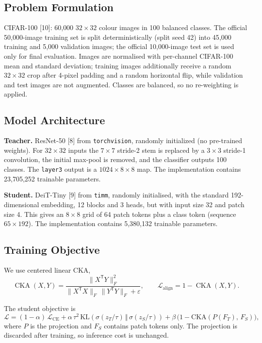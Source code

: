 \documentclass[11pt, letterpaper]{article}
\begin{document}
\subsection{Problem Formulation}

CIFAR-100 [10]: 60{,}000 $32\times32$ colour images in 100 balanced classes.
The official 50{,}000-image training set is split deterministically (split seed
42) into 45{,}000 training and 5{,}000 validation images; the official
10{,}000-image test set is used only for final evaluation. Images are
normalised with per-channel CIFAR-100 mean and standard deviation; training
images additionally receive a random $32\times32$ crop after 4-pixel padding
and a random horizontal flip, while validation and test images are not
augmented. Classes are balanced, so no re-weighting is applied.

\subsection{Model Architecture}

\textbf{Teacher.} ResNet-50 [8] from \texttt{torchvision}, randomly initialized
(no pre-trained weights). For $32\times32$ inputs the $7\times7$ stride-2 stem
is replaced by a $3\times3$ stride-1 convolution, the initial max-pool is
removed, and the classifier outputs 100 classes. The \texttt{layer3} output is
a $1024\times8\times8$ map. The implementation contains 23,705,252 trainable
parameters.

\textbf{Student.} DeiT-Tiny [9] from \texttt{timm}, randomly initialised, with
the standard 192-dimensional embedding, 12 blocks and 3 heads, but with input
size 32 and patch size 4. This gives an $8\times8$ grid of 64 patch tokens plus
a class token (sequence $65\times192$). The implementation contains
5,380,132 trainable parameters.

\subsection{Training Objective}

We use centered linear CKA,
\[
\operatorname{CKA}(X,Y)=
\frac{\lVert X^{\mathsf T}Y\rVert_F^2}
{\lVert X^{\mathsf T}X\rVert_F\,\lVert Y^{\mathsf T}Y\rVert_F+\varepsilon},
\qquad \mathcal{L}_{\mathrm{align}}=1-\operatorname{CKA}(X,Y).
\]

The student objective is
\[
\mathcal{L} = (1-\alpha)\,\mathcal{L}_{\text{CE}}
            + \alpha\,\tau^{2}\,\mathrm{KL}\!\left(\sigma(z_T/\tau)\,\Vert\,\sigma(z_S/\tau)\right)
            + \beta\,\bigl(1-\mathrm{CKA}(P(F_T),\,F_S)\bigr),
\]
where $P$ is the projection and $F_S$ contains patch tokens only. The
projection is discarded after training, so inference cost is unchanged.
\end{document}

